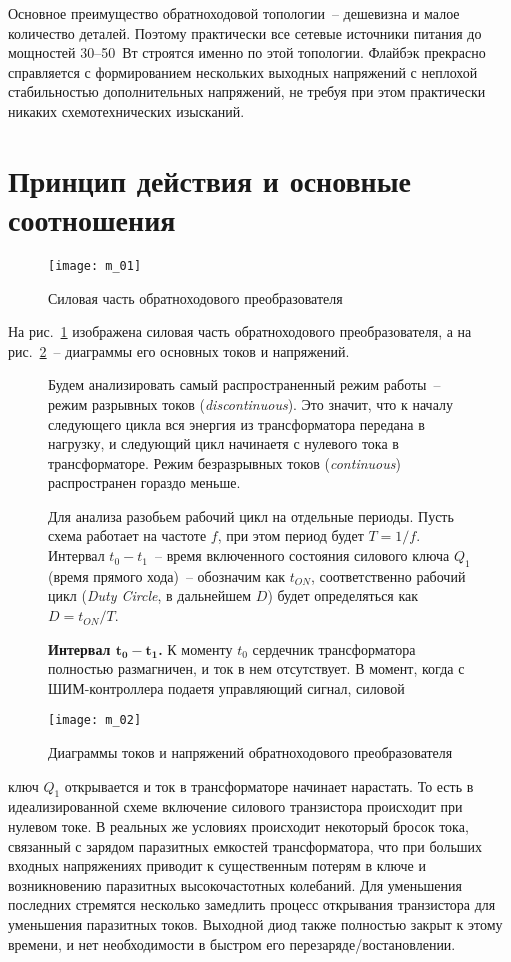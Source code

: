 Основное преимущество обратноходовой топологии~-- дешевизна и малое количество деталей. Поэтому практически все сетевые источники питания до мощностей 30--50~Вт строятся именно по этой топологии. Флайбэк прекрасно справляется с формированием нескольких выходных напряжений с неплохой стабильностью дополнительных напряжений, не требуя при этом практически никаких схемотехнических изысканий. 
\newpage

\section{Принцип действия и основные соотношения}
\begin{figure}[h!]
    \center
    \texttt{[image: m\_01]}
    \parbox{.6\textwidth}{\caption{Силовая часть обратноходового преобразователя}\label{p01}}
\end{figure}
        На  рис.~\ref{p01} изображена силовая часть обратноходового преобразователя, а на рис.~\ref{p02}~-- диаграммы его основных токов и напряжений.
        
\begin{figure}[h!]
    \begin{minipage}{.5\textwidth}
        Будем анализировать самый распространенный режим работы~-- режим разрывных токов (\emph{discontinuous}). Это значит, что к началу  следующего цикла вся энергия из трансформатора передана в нагрузку, и следующий цикл начинаетя с нулевого тока в трансформаторе. Режим безразрывных токов (\emph{continuous}) распространен гораздо меньше.
        
        Для анализа разобьем рабочий цикл на отдельные периоды. Пусть схема работает на частоте \( f \), при этом период будет \( T = 1/f \). Интервал \( t_0 - t_1 \)~-- время включенного состояния силового ключа \( Q_1 \) (время прямого хода)~-- обозначим как \( t_{ON} \), соответственно рабочий цикл (\emph{Duty Circle}, в дальнейшем \( D \)) будет определяться как \( D = t_{ON}/T \).
        
        \textbf{Интервал \( \bm{t_0 - t_1} \).} К моменту \( t_0 \) сердечник трансформатора полностью размагничен, и ток в нем отсутствует. В момент, когда с ШИМ-контроллера подаетя управляющий сигнал, силовой
    \end{minipage} \hfill
    \begin{minipage}{.45\textwidth}
        \texttt{[image: m\_02]}
        \parbox{\textwidth}{\caption{Диаграммы токов и напряжений обратноходового преобразователя}\label{p02}}
    \end{minipage}
\end{figure}
\noindent ключ \( Q_1 \) открывается и ток в трансформаторе начинает нарастать. То есть в идеализированной схеме включение силового транзистора происходит при нулевом токе. В реальных же условиях происходит некоторый бросок тока, связанный с зарядом паразитных емкостей трансформатора, что при больших входных напряжениях приводит к существенным потерям в ключе и возникновению паразитных высокочастотных колебаний. Для  уменьшения последних стремятся несколько замедлить процесс открывания транзистора для уменьшения паразитных токов. Выходной диод также полностью закрыт к этому времени, и нет необходимости в быстром его перезаряде/востановлении.

